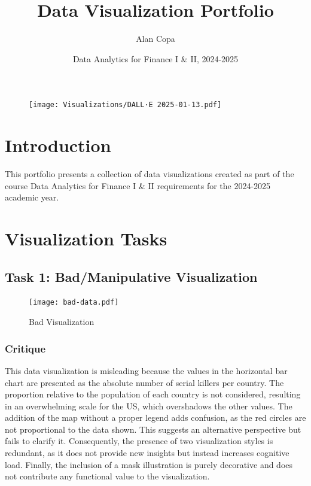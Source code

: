 \documentclass[a4paper,landscape]{article}
\title{Data Visualization Portfolio}
\author{Alan Copa}
\date{Data Analytics for Finance I \& II, 2024-2025}
\begin{document}
\maketitle
\begin{figure}[H]
    \centering
    \texttt{[image: Visualizations/DALL·E 2025-01-13.pdf]}
\end{figure}

\tableofcontents


\section{Introduction}
This portfolio presents a collection of data visualizations created as part of the course Data Analytics for Finance I \& II requirements for the 2024-2025 academic year.

\section{Visualization Tasks}

\subsection{Task 1: Bad/Manipulative Visualization}
\begin{figure}[H]
    \centering
    \texttt{[image: bad-data.pdf]} %
    \caption{Bad Visualization \cite{worldatlas2025serialkillers}}
    \label{fig:bad}
\end{figure}

\subsubsection{Critique}
This data visualization is misleading because the values in the horizontal bar chart are presented as the absolute number of serial killers per country. The proportion relative to the population of each country is not considered, resulting in an overwhelming scale for the US, which overshadows the other values. The addition of the map without a proper legend adds confusion, as the red circles are not proportional to the data shown. This suggests an alternative perspective but fails to clarify it. Consequently, the presence of two visualization styles is redundant, as it does not provide new insights but instead increases cognitive load. Finally, the inclusion of a mask illustration is purely decorative and does not contribute any functional value to the visualization.
\end{document}
